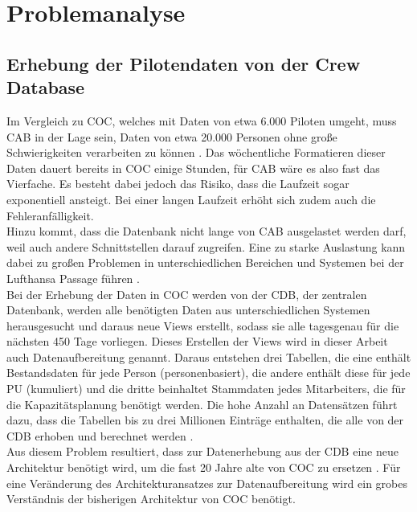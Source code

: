 \documentclass [12pt, a4paper, oneside, titlepage, ngerman]{article}
\begin{document}
\newpage

\section{Problemanalyse} \label{unterschiede}
\subsection{Erhebung der Pilotendaten von der Crew Database}
Im Vergleich zu \ac{COC}, welches mit Daten von etwa 6.000 Piloten umgeht, muss \ac{CAB} in der Lage sein, Daten von etwa 20.000 Personen ohne große Schwierigkeiten verarbeiten zu können \cite[vgl.][]{Gespraech1}. Das wöchentliche Formatieren dieser Daten dauert bereits in \ac{COC} einige Stunden, für \ac{CAB} wäre es also fast das Vierfache. Es besteht dabei jedoch das Risiko, dass die Laufzeit sogar exponentiell ansteigt. Bei einer langen Laufzeit erhöht sich zudem auch die Fehleranfälligkeit. \\
Hinzu kommt, dass die Datenbank nicht lange von \ac{CAB} ausgelastet werden darf, weil auch andere Schnittstellen darauf zugreifen. Eine zu starke Auslastung kann dabei zu großen Problemen in unterschiedlichen Bereichen und Systemen bei der Lufthansa Passage führen \cite[vgl.][]{Gespraech1}. \\

\noindent Bei der Erhebung der Daten in \ac{COC} werden von der \ac{CDB}, der zentralen Datenbank, werden alle benötigten Daten aus unterschiedlichen Systemen herausgesucht und daraus neue Views erstellt, sodass sie alle tagesgenau für die nächsten 450 Tage vorliegen. Dieses Erstellen der Views wird in dieser Arbeit auch Datenaufbereitung genannt. Daraus entstehen drei Tabellen, die eine enthält Bestandsdaten für jede Person (personenbasiert), die andere enthält diese für jede PU (kumuliert) und die dritte beinhaltet Stammdaten jedes Mitarbeiters, die für die Kapazitätsplanung benötigt werden. Die hohe Anzahl an Datensätzen führt dazu, dass die Tabellen bis zu drei Millionen Einträge enthalten, die alle von der \ac{CDB} erhoben und berechnet werden \cite[vgl.][]{Gespraech3}.  \\

\noindent Aus diesem Problem resultiert, dass zur Datenerhebung aus der \ac{CDB} eine neue Architektur benötigt wird, um die fast 20 Jahre alte von \ac{COC} zu ersetzen \cite[vgl.][]{Gespraech3}. Für eine Veränderung des Architekturansatzes zur Datenaufbereitung wird ein grobes Verständnis der bisherigen Architektur von \ac{COC} benötigt.
\end{document}
